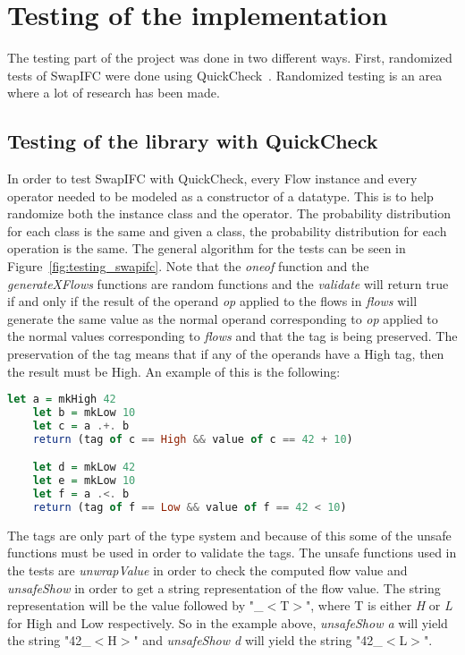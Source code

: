 \chapter{Testing of the implementation}
The testing part of the project was done in two different ways. First, randomized tests of SwapIFC were done using QuickCheck~\cite{quickcheck, quickcheck-wiki}. Randomized testing is an area where a lot of research has been made.
\section{Testing of the library with QuickCheck}
In order to test SwapIFC with QuickCheck, every Flow instance and every operator needed to be modeled as a constructor of a datatype. This is to help randomize both the instance class and the operator. The probability distribution for each class is the same and given a class, the probability distribution for each operation is the same. The general algorithm for the tests can be seen in Figure~\ref{fig:testing_swapifc}. Note that the \emph{oneof} function and the \emph{generateXFlows} functions are random functions and the \emph{validate} will return true if and only if the result of the operand \emph{op} applied to the flows in \emph{flows} will generate the same value as the normal operand corresponding to \emph{op} applied to the normal values corresponding to \emph{flows} and that the tag is being preserved. The preservation of the tag means that if any of the operands have a High tag, then the result must be High. An example of this is the following:
\begin{center}
  \begin{lstlisting}[language=Haskell]
    let a = mkHigh 42
    let b = mkLow 10
    let c = a .+. b
    return (tag of c == High && value of c == 42 + 10)

    let d = mkLow 42
    let e = mkLow 10
    let f = a .<. b
    return (tag of f == Low && value of f == 42 < 10)
  \end{lstlisting}
\end{center}

The tags are only part of the type system and because of this some of the unsafe functions must be used in order to validate the tags. The unsafe functions used in the tests are \emph{unwrapValue} in order to check the computed flow value and \emph{unsafeShow} in order to get a string representation of the flow value. The string representation will be the value followed by "\_$<$T$>$", where T is either \emph{H} or \emph{L} for High and Low respectively. So in the example above, \emph{unsafeShow a} will yield the string "42\_$<$H$>$" and \emph{unsafeShow d} will yield the string "42\_$<$L$>$".

